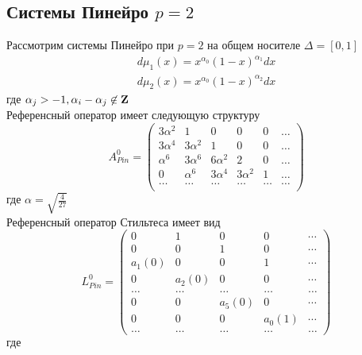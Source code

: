 \documentclass[12pt, a4paper]{report}
\begin{document}
\subsection{Системы Пинейро $p=2$}
Рассмотрим системы Пинейро при $p=2$ на общем носителе $\Delta=[0,1]$ 
$$
\begin{array}{llll}
d\mu_1(x)=x^{\alpha_0}(1-x)^{\alpha_1}dx \\
d\mu_2(x)=x^{\alpha_0}(1-x)^{\alpha_2}dx
\end{array}
$$
где $\alpha_j>-1, \alpha_i-\alpha_j \not \in \bf Z \rm$ \\
Референсный оператор имеет следующую структуру
$$
A^0_{Pin}=
\left(
\begin{array}{cccccccc}
3\alpha^2 & 1 & 0 & 0 & 0 & \ldots \\
3\alpha^4 & 3\alpha^2 & 1 & 0 & 0 & \ldots \\
\alpha^6 & 3\alpha^6 & 6\alpha^2 & 2 & 0 & \ldots \\
0 & \alpha^6 & 3\alpha^4 & 3\alpha^2 & 1 & \ldots \\
\ldots & \ldots & \ldots & \ldots & \ldots & \ldots \\
\end{array}
\right)
$$
где $\alpha=\displaystyle\sqrt{\frac{4}{27}}$ \\
Референсный оператор Стильтеса имеет вид
$$
L^0_{Pin} = \left(\begin{array}{cccccccccccc}
0 & 1 & 0 & 0 &  \cdots \\
0 & 0 & 1 & 0 &  \cdots \\
a_1(0) & 0 & 0 & 1 &  \cdots \\
0 & a_2(0) & 0 & 0 &  \cdots \\
\ldots & \ldots & \ldots & \ldots & \ldots \\
0 & 0 & a_5(0) & 0 &  \cdots \\
0 & 0 & 0 & a_0(1) &  \cdots \\
\ldots & \ldots & \ldots & \ldots & \ldots
\end{array}\right)
$$ 
где
\end{document}
